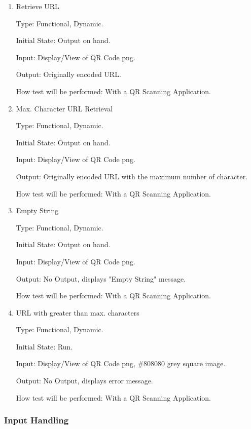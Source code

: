 \documentclass[12pt, titlepage]{article}
\begin{document}
\begin{enumerate}

\item{Retrieve URL\\}

Type: Functional, Dynamic.
					
Initial State: Output on hand.
					
Input: Display/View of QR Code png.
					
Output: Originally encoded URL.
					
How test will be performed: With a QR Scanning Application.
					
\item{Max. Character URL Retrieval \\}

Type: Functional, Dynamic.
			
Initial State: Output on hand.
					
Input: Display/View of QR Code png.
					
Output: Originally encoded URL with the maximum number of character.  
					
How test will be performed: With a QR Scanning Application.


\item{Empty String\\}

Type: Functional, Dynamic.
					
Initial State: Output on hand.
					
Input: Display/View of QR Code png. 
					
Output: No Output, displays "Empty String" message.
					
How test will be performed: With a QR Scanning Application.


\item{URL with greater than max. characters\\}

Type: Functional, Dynamic.
					
Initial State: Run.
					
Input: Display/View of QR Code png, \#808080 grey square image.
					
Output: No Output, displays error message.
					
How test will be performed: With a QR Scanning Application.

\end{enumerate}

\subsubsection{Input Handling}
\end{document}

